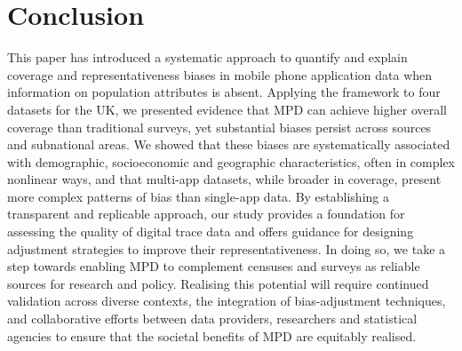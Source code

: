 \documentclass[]{rsos}%
\begin{document}
\section{Conclusion}\label{conclusion}

This paper has introduced a systematic approach to quantify and explain
coverage and representativeness biases in mobile phone application data
when information on population attributes is absent. Applying the
framework to four datasets for the UK, we presented evidence that MPD
can achieve higher overall coverage than traditional surveys, yet
substantial biases persist across sources and subnational areas. We
showed that these biases are systematically associated with demographic,
socioeconomic and geographic characteristics, often in complex nonlinear
ways, and that multi-app datasets, while broader in coverage, present
more complex patterns of bias than single-app data. By establishing a
transparent and replicable approach, our study provides a foundation for
assessing the quality of digital trace data and offers guidance for
designing adjustment strategies to improve their representativeness. In
doing so, we take a step towards enabling MPD to complement censuses and
surveys as reliable sources for research and policy. Realising this
potential will require continued validation across diverse contexts, the
integration of bias-adjustment techniques, and collaborative efforts
between data providers, researchers and statistical agencies to ensure
that the societal benefits of MPD are equitably realised.










\end{document}
